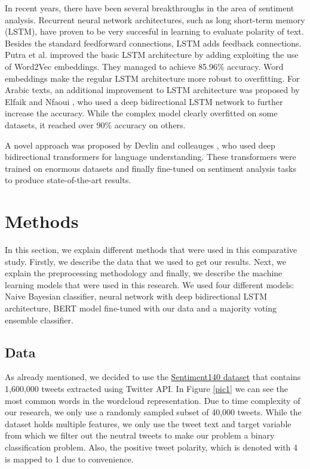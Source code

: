 \documentclass[conference]{IEEEtran}
\begin{document}
In recent years, there have been several breakthroughs in the area of sentiment analysis. Recurrent neural network architectures, such as long short-term memory (LSTM), have proven to be very succesful in learning to evaluate polarity of text. Besides the standard feedforward connections, LSTM adds feedback connections. Putra et al. \cite{lstm} improved the basic LSTM architecture by adding exploiting the use of Word2Vec embeddings. They managed to achieve 85.96\% accuracy. Word embeddings make the regular LSTM architecture more robust to overfitting. For Arabic texts, an additional improvement to LSTM architecture was proposed by Elfaik and Nfaoui \cite{bilstm}, who used a deep bidirectional LSTM network to further increase the accuracy. While the complex model clearly overfitted on some datasets, it reached over 90\% accuracy on others.

A novel approach was proposed by Devlin and colleauges \cite{devlin2019bert}, who used deep bidirectional transformers for language understanding. These transformers were trained on enormous datasets and finally fine-tuned on sentiment analysis tasks to produce state-of-the-art results. 

\section{Methods}
In this section, we explain different methods that were used in this comparative study. Firstly, we describe the data that we used to get our results. Next, we explain the preprocessing methodology and finally, we describe the machine learning models that were used in this research. We used four different models: Naive Bayesian classifier, neural network with deep bidirectional LSTM architecture, BERT model fine-tuned with our data and a majority voting ensemble classifier.

\subsection{Data}
As already mentioned, we decided to use the \href{https://www.kaggle.com/kazanova/sentiment140}{Sentiment140 dataset} that contains 1,600,000 tweets extracted using Twitter API. In Figure \ref{pic1} we can see the most common words in the wordcloud representation. Due to time complexity of our research, we only use a randomly sampled subset of 40,000 tweets. While the dataset holds multiple features, we only use the tweet text and target variable from which we filter out the neutral tweets to make our problem a binary classification problem. Also, the positive tweet polarity, which is denoted with 4 is mapped to 1 due to convenience.
\end{document}
